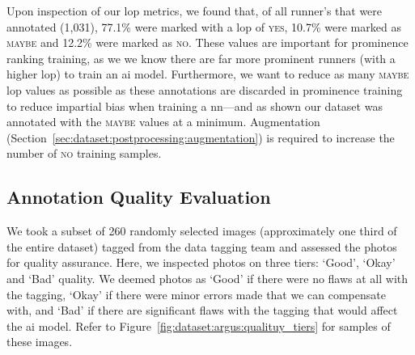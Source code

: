 Upon inspection of our \gls{lop} metrics, we found that, of all runner's that were annotated (1,031), 77.1\% were marked with a \gls{lop} of \textsc{yes}, 10.7\% were marked as \textsc{maybe} and 12.2\% were marked as \textsc{no}. These values are important for prominence ranking training, as we we know there are far more prominent runners (with a higher \gls{lop}) to train an \gls{ai} model. Furthermore, we want to reduce as many \textsc{maybe} \gls{lop} values as possible as these annotations are discarded in prominence training to reduce impartial bias when training a \gls{nn}---and as shown our dataset was annotated with the \textsc{maybe} values at a minimum. Augmentation (Section~\ref{sec:dataset:postprocessing:augmentation}) is required to increase the number of \textsc{no} training samples.

\subsection{Annotation Quality Evaluation}
\label{sec:dataset:argus:quality_eval}

We took a subset of 260 randomly selected images  (approximately one third of the entire dataset) tagged from the data tagging team and assessed the photos for quality assurance. Here, we inspected photos on three tiers: `Good', `Okay' and `Bad' quality. We deemed photos as `Good' if there were no flaws at all with the tagging, `Okay' if there were minor errors made that we can compensate with, and `Bad' if there are significant flaws with the tagging that would affect the \gls{ai} model. Refer to Figure~\ref{fig:dataset:argus:qualituy_tiers} for samples of these images.

